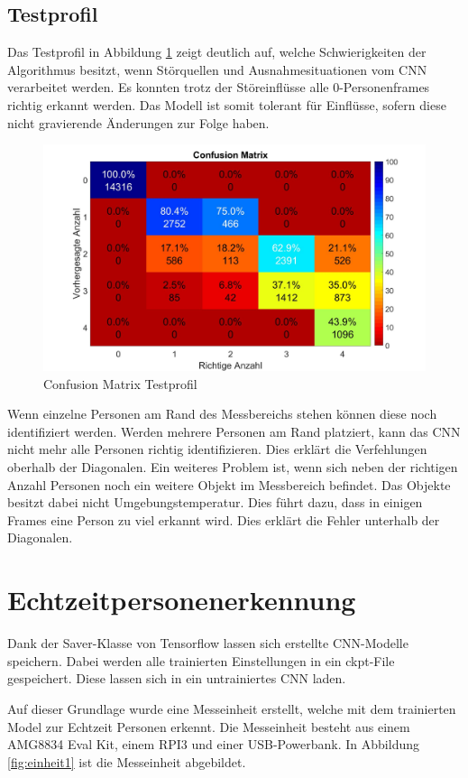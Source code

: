 \subsection{Testprofil}
\label{subsec:Testprofil}
Das Testprofil in Abbildung \ref{fig:profil4} zeigt deutlich auf, welche Schwierigkeiten der Algorithmus besitzt, wenn Störquellen und Ausnahmesituationen vom \ac{CNN} verarbeitet werden. Es konnten trotz der Störeinflüsse alle 0-Personenframes richtig erkannt werden. Das Modell ist somit tolerant für Einflüsse, sofern diese nicht gravierende Änderungen zur Folge haben.
 
\begin{figure}[H]
	\centering
	\includegraphics[width=0.55\linewidth]{fig/Testprofilm}
	\caption{Confusion Matrix Testprofil}
	\label{fig:profil4}
\end{figure}

Wenn einzelne Personen am Rand des Messbereichs stehen können diese noch identifiziert werden. Werden mehrere Personen am Rand platziert, kann das \ac{CNN} nicht mehr alle Personen richtig identifizieren. Dies erklärt die Verfehlungen oberhalb der Diagonalen.
Ein weiteres Problem ist, wenn sich neben der richtigen Anzahl Personen noch ein weitere Objekt im Messbereich befindet. Das Objekte besitzt dabei nicht Umgebungstemperatur. Dies führt dazu, dass in einigen Frames eine Person zu viel erkannt wird. Dies erklärt die Fehler unterhalb der Diagonalen. 

\newpage

\section{Echtzeitpersonenerkennung}
\label{sec:Echtzeitpersonenerkennung}
Dank der Saver-Klasse von Tensorflow lassen sich erstellte \ac{CNN}-Modelle speichern. Dabei werden alle trainierten Einstellungen in ein ckpt-File gespeichert. Diese lassen sich in ein untrainiertes \ac{CNN} laden.

Auf dieser Grundlage wurde eine Messeinheit erstellt, welche mit dem trainierten Model zur Echtzeit Personen erkennt. Die Messeinheit besteht aus einem AMG8834 Eval Kit, einem \ac{RPI3} und einer USB-Powerbank. 
In Abbildung \ref{fig:einheit1} ist die Messeinheit abgebildet. 


